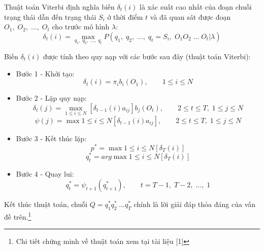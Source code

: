 Thuật toán Viterbi định nghĩa biến $\delta_t(i)$ là xác suất cao nhất của đoạn chuỗi trạng thái dẫn đến trạng thái $S_i$ ở thời điểm $t$ và đã quan sát được đoạn $O_1,\; O_2,\; ...,\; O_t$ cho trước mô hình $\lambda$:
$$\delta_t(i) = \max_{q_1, \; q_2,\; ...,\; q_t} P(q_1, \; q_2,\; ...,\; q_t=S_i,\; O_1O_2\; ...\;O_t|\lambda)$$

Biến $\delta_t(i)$ được tính theo quy nạp với các bước sau đây (thuật toán Viterbi):
\begin{itemize}
	\item Bước 1 - Khởi tạo:
	$$\delta_t(i)=\pi_i b_i(O_1), \qquad 1\leq i \leq N$$
	\item Bước 2 - Lặp quy nạp:
	$$\delta_t(j)=\max_{1\leq i\leq N}[\delta_{t-1}(i)a_{ij}]b_j(O_t), \qquad 2\leq t \leq T,\; 1 \leq j \leq N $$
	$$\psi(j)=\max{1\leq i \leq N}[\delta_{t-1}(i)a_{ij}], \qquad 2\leq t \leq T,\; 1 \leq j \leq N$$
	\item Bước 3 - Kết thúc lặp:
	$$p^{*}=\max{1\leq i \leq N}[\delta_T(i)]$$
	$$q_t^{*}=arg \max{1\leq i \leq N}[\delta_T(i)]$$
	\item Bước 4 - Quay lui:
	$$q_t^{*}=\psi_{t+1}(q_{t+1}^{*}), \qquad t=T-1,\; T-2,\; ...,\; 1$$
\end{itemize}
Kết thúc thuật toán, chuỗi $Q=q_1^{*}q_2^{*}\; ... q_T^{*}$ chính là lời giải đáp thỏa đáng của vấn đề trên.\footnote{Chi tiết chứng minh về thuật toán xem tại tài liệu [1]}


